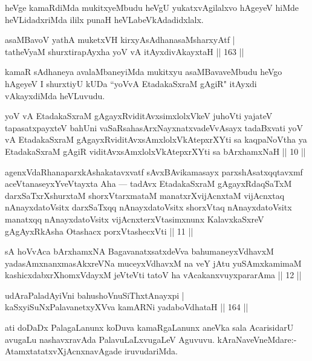 \begin{artha}%
heVge kamaRdiMda mukitxyeMbudu heVgU yukatxvAgilalxvo hAgeyeV hiMde heVLidadxriMda ililx punaH heVLabeVkAdadidxlalx.
\end{artha}

\begin{shl}
asaMBavoV yathA muketxVH kirxyAsAdhanasaMsharxyAtf |\\
tatheVyaM shurxtirapAyxha yoV vA itAyxdivAkayxtaH \hfill || 163 ||
\end{shl}

\begin{artha}
kamaR sAdhaneya avalaMbaneyiMda mukitxyu asaMBavaveMbudu heVgo hAgeyeV I shurxtiyU kUDa ``yoVvA EtadakaSxraM gAgiR" itAyxdi vAkayxdiMda heVLuvudu.
\end{artha}



\begin{kandikeshl}
yoV vA EtadakaSxraM gAgayxRviditAvxsimxlolxVkeV juhoVti yajateV tapasatxpayxteV bahUni vaSaRsahasArxNayxnatxvadeVvAsayx tadaBxvati yoV vA EtadakaSxraM gAgayxRviditAvxsAmxlolxVkAtepxrXYti sa kaqpaNoV\s tha ya EtadakaSxraM gAgiR viditAvxsAmxlolxVkAtepxrXYti sa bArxhamxNaH || 10 ||

agenxVdaRhanaparxkAshakatavxvatf sAvxBAvikamasayx parxshAsatxqqtavxmf aceVtanaseyxYveVtayxta Aha — tadAvx EtadakaSxraM gAgayxRdaqSaTxM darxSaTxrXshurxtaM shorxVtarxmataM manatxrXvijAcnxtaM vijAcnxtaq nAnayxdatoV\s sitx darxSaTxqq nAnayxdatoV\s sitx shorxVtaq nAnayxdatoV\s sitx manatxqq nAnayxdatoV\s sitx vijAcnxterxVtasimxnunx KalavxkaSxreV gAgAyxRkAsha Otashacx porxVtashecxVti || 11 ||

sA hoVvAca bArxhamxNA BagavanatxsatxdeVva bahumaneyxVdhavxM yadasAmxnanxmasAkxreVNa muceyxVdhavxM na veY jAtu yuSAmxkamimaM kashicxdabxrXhomxVdayxM jeVteVti tatoV ha vAcakanxvuyxpararAma || 12 ||
\end{kandikeshl}


\begin{shl}
udAraPaladAyiVni bahushoV\s nuSiThxtAnayxpi |\\
kaSxyiSuNxPalavanetxyXVva kamARNi yadaboVdhataH \hfill || 164 ||
\end{shl}

\begin{artha}
ati doDaDx PalagaLanunx koDuva kamaRgaLanunx aneVka sala AcarisidarU avugaLu nashavxravAda PalavuLaLxvugaLeV Aguvuvu. kAraNaveVneMdare:- AtamxtatatxvXjAcnxnavAgade iruvudariMda.
\end{artha}

